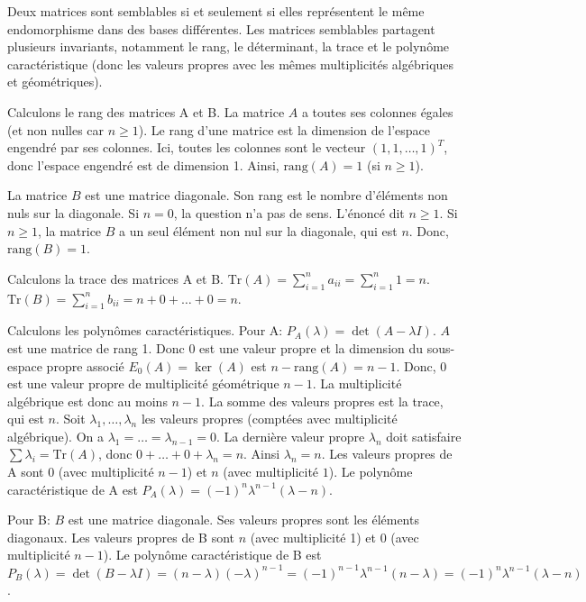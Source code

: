 \begin{solution}
Deux matrices sont semblables si et seulement si elles représentent le même endomorphisme dans des bases différentes. Les matrices semblables partagent plusieurs invariants, notamment le rang, le déterminant, la trace et le polynôme caractéristique (donc les valeurs propres avec les mêmes multiplicités algébriques et géométriques).

Calculons le rang des matrices A et B.
La matrice $A$ a toutes ses colonnes égales (et non nulles car $n \ge 1$). Le rang d'une matrice est la dimension de l'espace engendré par ses colonnes. Ici, toutes les colonnes sont le vecteur $(1, 1, \dots, 1)^T$, donc l'espace engendré est de dimension 1. Ainsi, $\text{rang}(A) = 1$ (si $n \ge 1$).

La matrice $B$ est une matrice diagonale. Son rang est le nombre d'éléments non nuls sur la diagonale.
Si $n=0$, la question n'a pas de sens. L'énoncé dit $n \ge 1$.
Si $n \ge 1$, la matrice $B$ a un seul élément non nul sur la diagonale, qui est $n$. Donc, $\text{rang}(B) = 1$.

Calculons la trace des matrices A et B.
$\text{Tr}(A) = \sum_{i=1}^n a_{ii} = \sum_{i=1}^n 1 = n$.
$\text{Tr}(B) = \sum_{i=1}^n b_{ii} = n + 0 + \dots + 0 = n$.

Calculons les polynômes caractéristiques.
Pour A: $P_A(\lambda) = \det(A - \lambda I)$. $A$ est une matrice de rang 1. Donc 0 est une valeur propre et la dimension du sous-espace propre associé $E_0(A) = \ker(A)$ est $n - \text{rang}(A) = n-1$. Donc, 0 est une valeur propre de multiplicité géométrique $n-1$. La multiplicité algébrique est donc au moins $n-1$.
La somme des valeurs propres est la trace, qui est $n$. Soit $\lambda_1, \dots, \lambda_n$ les valeurs propres (comptées avec multiplicité algébrique). On a $\lambda_1 = \dots = \lambda_{n-1} = 0$. La dernière valeur propre $\lambda_n$ doit satisfaire $\sum \lambda_i = \text{Tr}(A)$, donc $0 + \dots + 0 + \lambda_n = n$. Ainsi $\lambda_n = n$.
Les valeurs propres de A sont $0$ (avec multiplicité $n-1$) et $n$ (avec multiplicité $1$).
Le polynôme caractéristique de A est $P_A(\lambda) = (-1)^n \lambda^{n-1} (\lambda - n)$.

Pour B: $B$ est une matrice diagonale. Ses valeurs propres sont les éléments diagonaux. Les valeurs propres de B sont $n$ (avec multiplicité 1) et $0$ (avec multiplicité $n-1$).
Le polynôme caractéristique de B est $P_B(\lambda) = \det(B - \lambda I) = (n-\lambda)(-\lambda)^{n-1} = (-1)^{n-1} \lambda^{n-1} (n-\lambda) = (-1)^n \lambda^{n-1} (\lambda - n)$.


\end{solution}
